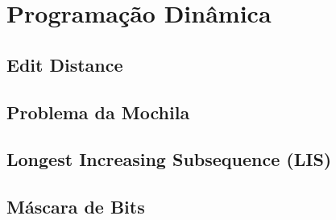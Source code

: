 % 

% 

% 

\section{Programação Dinâmica}

\subsection{Edit Distance}


\subsection{Problema da Mochila}


\subsection{Longest Increasing Subsequence (LIS)}


\subsection{Máscara de Bits}


% 

% 


